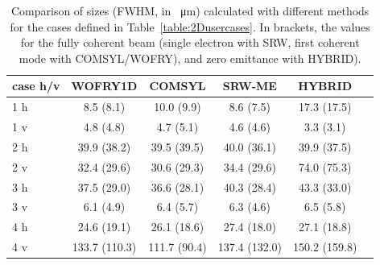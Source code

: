 \documentclass{iucr}              %
\begin{document}
\begin{table}[]
    \label{table:comparison}
    \caption{Comparison of sizes (FWHM, in \SI{}{\micro\meter}) calculated with different methods for the cases defined in Table~\ref{table:2Dusercases}.
    In brackets, the values for the fully coherent beam (single electron with SRW, first coherent mode with COMSYL/WOFRY), and zero emittance with HYBRID). 
    }
    \centering
    \begin{tabular}{p{}|c|c|c|c|c}
         case h/v &
         WOFRY1D&
         COMSYL&
         SRW-ME&
         HYBRID \\
         \hline
1 h  & 8.5 (8.1)    & 10.0 (9.9)  & 8.6 (7.5)   & 17.3 (17.5) \\
1 v  & 4.8 (4.8)    & 4.7 (5.1)   & 4.6 (4.6)   & 3.3 (3.1) \\
\hline
2 h  & 39.9 (38.2)  & 39.5 (39.5) & 40.0 (36.1)  & 39.9 (37.5) \\
2 v  & 32.4 (29.6)  & 30.6 (29.3) & 34.4 (29.6)  & 74.0 (75.3) \\
\hline
3 h  & 37.5 (29.0)  & 36.6 (28.1) & 40.3 (28.4)  & 43.3 (33.0) \\
3 v  & 6.1 (4.9)   & 6.4 (5.7)   & 6.3 (4.6)    & 6.5 (5.8) \\
\hline
4 h  & 24.6 (19.1)  & 26.1 (18.6)  & 27.4 (18.0)   & 27.1 (18.8) \\
4 v  & 133.7 (110.3)& 111.7 (90.4) & 137.4 (132.0) & 150.2 (159.8) \\
    \end{tabular}
\end{table}





\newpage
\onecolumn
\end{document}
